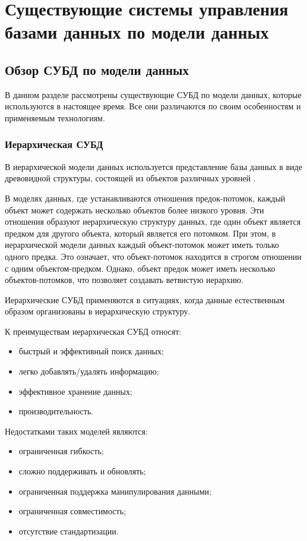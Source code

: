 \section{Существующие системы управления базами данных по модели данных}

\subsection{Обзор СУБД по модели данных}

В данном разделе рассмотрены существующие СУБД по модели данных, которые используются в настоящее время. Все они различаются по своим особенностям и применяемым технологиям.

\subsubsection{Иерархическая СУБД}
В иерархической модели данных используется представление базы данных в виде древовидной структуры, состоящей из объектов различных уровней \cite{adreyev}.

В моделях данных, где устанавливаются отношения предок-потомок, каждый объект может содержать несколько объектов более низкого уровня.
Эти отношения образуют иерархическую структуру данных, где один объект является предком для другого объекта, который является его потомком.
При этом, в иерархической модели данных каждый объект-потомок может иметь только одного предка.
Это означает, что объект-потомок находится в строгом отношении с одним объектом-предком.
Однако, объект предок может иметь несколько объектов-потомков, что позволяет создавать ветвистую иерархию.

Иерархические СУБД применяются в ситуациях, когда данные естественным образом организованы в иерархическую структуру.

К преимуществам иерархическая СУБД относят:
\begin{itemize}
	\item быстрый и эффективный поиск данных;
	\item легко добавлять/удалять информацию;
	\item эффективное хранение данных;
	\item производительность.
\end{itemize}

Недостатками таких моделей являются:
\begin{itemize}
	\item ограниченная гибкость;
	\item сложно поддерживать и обновлять;
	\item ограниченная поддержка манипулирования данными;
	\item ограниченная совместимость;
	\item отсутствие стандартизации.
\end{itemize}

